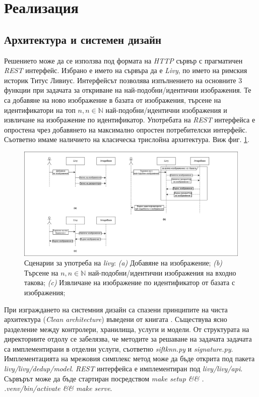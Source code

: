 \documentclass[a4paper,12pt]{article}
\begin{document}
\section{Реализация}

\subsection{Архитектура и системен дизайн}

Решението може да се използва под формата на \textit{HTTP} сървър с прагматичен \textit{REST} интерфейс. Избрано е името на сървъра да е \textit{Livy}, по името на римския историк Титус Ливиус. Интерфейсът позволява изпълнението на основните 3 функции при задачата за откриване на най-подобни/идентични изображения. Те са добавяне на ново изображение в базата от изображения, търсене на идентификатори на топ $n, n \in \mathbb{N}$ най-подобни/идентични изображения и извличане на изображение по идентификатор. Употребата на \textit{REST} интерфейса е опростена чрез добавянето на максимално опростен потребителски интерфейс. Съответно имаме наличието на класическа трислойна архитектура. Виж фиг. \ref{fig:sequencediagrams}.

\begin{figure}[ht]
    \centering
    \includegraphics[width=\textwidth]{sequencediagrams.png}
    \caption{Сценарии за употреба на \textit{livy}: \textit{(a)} Добавяне на изображение; \textit{(b)} Търсене на $n, n \in \mathbb{N}$ най-подобни/идентични изображения на входно такова; \textit{(c)} Извличане на изображение по идентификатор от базата с изображения;}
    \label{fig:sequencediagrams}
\end{figure}

\bigbreak

При изграждането на системния дизайн са спазени принципите на чиста архитектура (\textit{Clean architecture}) въведени от книгата \cite{cleanarchitecture}. Съществува ясно разделение между контролери, хранилища, услуги и модели. От структурата на директориите отдолу се забелязва, че методите за решаване на задачата задачата са имплементирани в отделни услуги, съответно \textit{siftknn.py} и \textit{signature.py}. Имплементацията на мрежовия симплекс метод може да бъде открита под пакета \textit{livy/livy/dedup/model}. \textit{REST} интерфейса е имплементиран под \textit{livy/livy/api}. Сървърът може да бъде стартиран посредством \textit{make setup \&\& . .venv/bin/activate \&\& make serve}.
\end{document}
